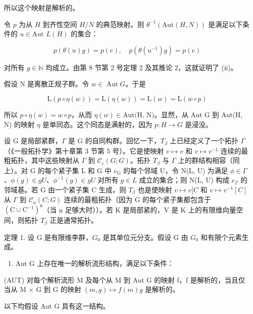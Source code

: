 所以这个映射是解析的。

令 \(p\) 为从 \(H\) 到齐性空间 \(H/N\) 的典范映射。则 \(\theta^{-1}(\text{Aut}(H, N))\) 是满足以下条件的 \(u \in \text{Aut } L(H)\) 的集合：

\[
p (\theta (u) g) = p (e), \quad p (\theta (u ^ {- 1}) g) = p (e)
\]

对所有 \(g \in \mathbb{N}\) 均成立。由第 8 节第 2 号定理 2 及其推论 2，这就证明了 (ii)。

假设 N 是离散正规子群。令 \(w \in \operatorname{Aut} G\)。于是

\[
\mathrm{L} (p \circ \eta (w)) = \mathrm{L} (\eta (w)) = \mathrm{L} (w) = \mathrm{L} (w \circ p)
\]

所以 \(p \circ \eta(w) = w \circ p\)，从而 \(\eta(w) \in \text{Aut(H, N)}\)。显然，从 Aut G 到 Aut(H, N) 的映射 \(\eta\) 是单同态。这个同态是满射的，因为 \(p: H \to G\) 是浸没。

设 G 是局部紧群，\(\Gamma\) 是 G 的自同构群。回忆一下，\(T_{\beta}\) 上已经定义了一个拓扑 \(\Gamma\)（《一般拓扑学》第十章第 3 节第 5 号）。它是使映射 \(v \mapsto v\) 和 \(v \mapsto v^{-1}\) 连续的最粗拓扑，其中这些映射从 \(\Gamma\) 到 \(\mathcal{C}_{\varepsilon}(G; G)\)。拓扑 \(T_{\beta}\) 与 \(\Gamma\) 上的群结构相容（同上）。对 G 的每个紧子集 L 和 G 中 \(e_{\mathrm{G}}\) 的每个邻域 U，令 N(L, U) 为满足 \(\phi \in \Gamma\)、\(\phi(g) \in gU\)、\(\phi^{-1}(g) \in gU\) 对所有 \(g \in L\) 成立的集合；则 N(L, U) 构成 \(e_{\Gamma}\) 的邻域基。若 G 由一个紧子集 C 生成，则 \(T_{\beta}\) 也是使映射 \(v \mapsto v[C\) 和 \(v \mapsto v^{-1}[C]\) 从 \(\Gamma\) 到 \(\mathcal{C}_{u}(C; G)\) 连续的最粗拓扑（因为 G 的每个紧子集都包含于 \((\mathrm{C} \cup \mathrm{C}^{-1})^{\mathrm{n}}\)（当 n 足够大时））。若 K 是局部紧的，V 是 K 上的有限维向量空间，则拓扑 \(T_{\beta}\) 正是通常拓扑。

定理 1. 设 G 是有限维李群，\(G_{0}\) 是其单位元分支。假设 G 由 \(G_{0}\) 和有限个元素生成。

\begin{enumerate}
\def\labelenumi{(\roman{enumi})}
\tightlist
\item
  Aut G 上存在唯一的解析流形结构，满足以下条件：
\end{enumerate}

(AUT) 对每个解析流形 M 及每个从 M 到 Aut G 的映射 f，f 是解析的，当且仅当从 M × G 到 G 的映射 \((m, g) \mapsto f(m)g\) 是解析的。

以下均假设 Aut G 具有这一结构。

